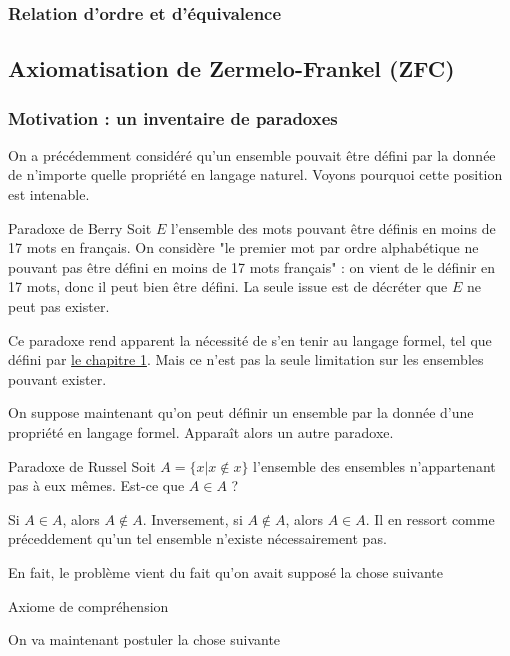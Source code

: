 \subsubsection{Relation d'ordre et d'équivalence}

\subsection{Axiomatisation de Zermelo-Frankel (ZFC)}
\subsubsection{Motivation : un inventaire de paradoxes}
On a précédemment considéré qu'un ensemble pouvait être défini par la donnée de n'importe quelle propriété en langage naturel. Voyons pourquoi cette position est intenable.

\begin{boite}{Paradoxe de Berry}
	Soit $E$ l'ensemble des mots pouvant être définis en moins de 17 mots en français. On considère "le premier mot par ordre alphabétique ne pouvant pas être défini en moins de 17 mots français" : on vient de le définir en 17 mots, donc il peut bien être défini. La seule issue est de décréter que $E$ ne peut pas exister. 
\end{boite}

Ce paradoxe rend apparent la nécessité de s'en tenir au langage formel, tel que défini par \hyperref[lang]{le chapitre 1}. Mais ce n'est pas la seule limitation sur les ensembles pouvant exister.

On suppose maintenant qu'on peut définir un ensemble par la donnée d'une propriété en langage formel. Apparaît alors un autre paradoxe.

\begin{boite}{Paradoxe de Russel}
	Soit $A=\{x|x\not\in x\}$ l'ensemble des ensembles n'appartenant pas à eux mêmes. Est-ce que $A\in A$ ?

	Si $A\in A$, alors $A\not \in A$. Inversement, si $A \not\in A$, alors $A\in A$. Il en ressort comme préceddement qu'un tel ensemble n'existe nécessairement pas. 
\end{boite}

En fait, le problème vient du fait qu'on avait supposé la chose suivante
\begin{boite}{Axiome de compréhension}

\end{boite}

On va maintenant postuler la chose suivante
\begin{boite}
	
\end{boite}

